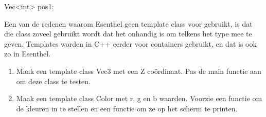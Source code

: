 \documentclass[11pt, oldfontcommands, oneside, a4paper]{memoir}
\begin{document}
\begin{code}
Vec<int> pos1;
\end{code}

\begin{note}
Een van de redenen waarom Esenthel geen template class voor  gebruikt, is dat die class zoveel gebruikt wordt dat het onhandig is om telkens het type mee te geven. Templates worden in C++ eerder voor containers gebruikt, en dat is ook zo in Esenthel.
\end{note}

\begin{exercise}
\begin{enumerate}
	\item Maak een template class Vec3 met een Z co\"ordinaat. Pas de main functie aan om deze class te testen.
	\item Maak een template class Color met r, g en b waarden. Voorzie een functie om de kleuren in te stellen en een functie om ze op het scherm te printen.
\end{enumerate}
\end{exercise}
\end{document}
